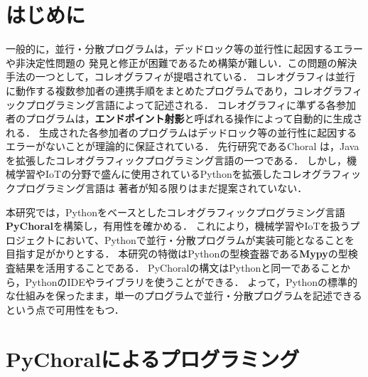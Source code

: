 \documentclass{resume}
\begin{document}
\maketitle

\section{はじめに}

一般的に，並行・分散プログラムは，デッドロック等の並行性に起因するエラーや非決定性問題の
発見と修正が困難であるため構築が難しい．この問題の解決手法の一つとして，コレオグラフィが提唱されている．
コレオグラフィは並行に動作する複数参加者の連携手順をまとめたプログラムであり，コレオグラフィックプログラミング言語によって記述される．
コレオグラフィに準ずる各参加者のプログラムは，\textbf{エンドポイント射影}と呼ばれる操作によって自動的に生成される．
生成された各参加者のプログラムはデッドロック等の並行性に起因するエラーがないことが理論的に保証されている．
先行研究であるChoral \cite{choral}は，Javaを拡張したコレオグラフィックプログラミング言語の一つである．
しかし，機械学習やIoTの分野で盛んに使用されているPythonを拡張したコレオグラフィックプログラミング言語は
著者が知る限りはまだ提案されていない．

本研究では，Pythonをベースとしたコレオグラフィックプログラミング言語\textbf{PyChoral}を構築し，有用性を確かめる．
これにより，機械学習やIoTを扱うプロジェクトにおいて、Pythonで並行・分散プログラムが実装可能となることを目指す足がかりとする．
本研究の特徴はPythonの型検査器である\textbf{Mypy}の型検査結果を活用することである．
PyChoralの構文はPythonと同一であることから，PythonのIDEやライブラリを使うことができる．
よって，Pythonの標準的な仕組みを保ったまま，単一のプログラムで並行・分散プログラムを記述できるという点で可用性をもつ．


\section{PyChoralによるプログラミング}
\end{document}
